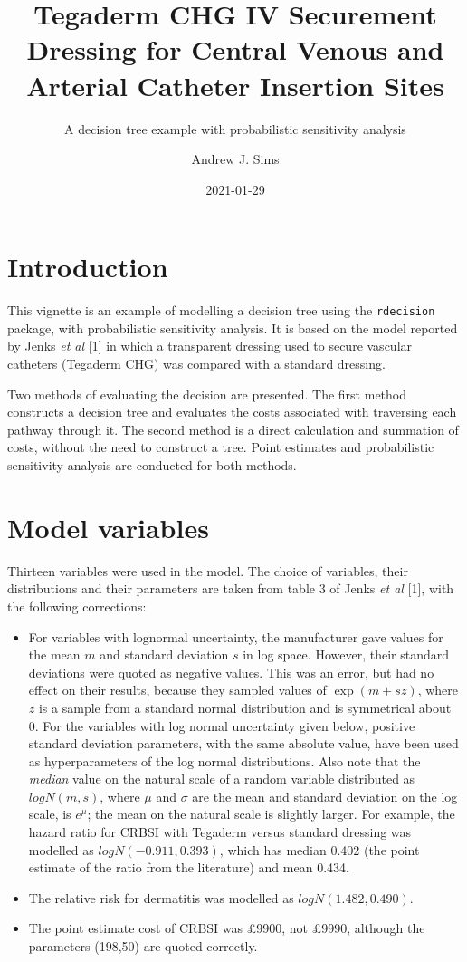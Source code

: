 \documentclass[
]{article}
\title{Tegaderm CHG IV Securement Dressing for Central Venous and Arterial
Catheter Insertion Sites}
\subtitle{A decision tree example with probabilistic sensitivity analysis}
\author{Andrew J. Sims}
\date{2021-01-29}
\providecommand{\tightlist}{%
  \setlength{\itemsep}{0pt}\setlength{\parskip}{0pt}}
\begin{document}
\maketitle

\hypertarget{introduction}{%
\section{Introduction}\label{introduction}}

This vignette is an example of modelling a decision tree using the
\texttt{rdecision} package, with probabilistic sensitivity analysis. It
is based on the model reported by Jenks \emph{et al} {[}1{]} in which a
transparent dressing used to secure vascular catheters (Tegaderm CHG)
was compared with a standard dressing.

Two methods of evaluating the decision are presented. The first method
constructs a decision tree and evaluates the costs associated with
traversing each pathway through it. The second method is a direct
calculation and summation of costs, without the need to construct a
tree. Point estimates and probabilistic sensitivity analysis are
conducted for both methods.

\hypertarget{model-variables}{%
\section{Model variables}\label{model-variables}}

Thirteen variables were used in the model. The choice of variables,
their distributions and their parameters are taken from table 3 of Jenks
\emph{et al} {[}1{]}, with the following corrections:

\begin{itemize}
\tightlist
\item
  For variables with lognormal uncertainty, the manufacturer gave values
  for the mean \(m\) and standard deviation \(s\) in log space. However,
  their standard deviations were quoted as negative values. This was an
  error, but had no effect on their results, because they sampled values
  of \(\exp(m + sz)\), where \(z\) is a sample from a standard normal
  distribution and is symmetrical about 0. For the variables with log
  normal uncertainty given below, positive standard deviation
  parameters, with the same absolute value, have been used as
  hyperparameters of the log normal distributions. Also note that the
  \emph{median} value on the natural scale of a random variable
  distributed as \(logN(m,s)\), where \(\mu\) and \(\sigma\) are the
  mean and standard deviation on the log scale, is \(e^\mu\); the mean
  on the natural scale is slightly larger. For example, the hazard ratio
  for CRBSI with Tegaderm versus standard dressing was modelled as
  \(logN(-0.911,0.393)\), which has median 0.402 (the point estimate of
  the ratio from the literature) and mean 0.434.
\item
  The relative risk for dermatitis was modelled as
  \(logN(1.482,0.490)\).
\item
  The point estimate cost of CRBSI was £9900, not £9990, although the
  parameters (198,50) are quoted correctly.
\end{itemize}
\end{document}

